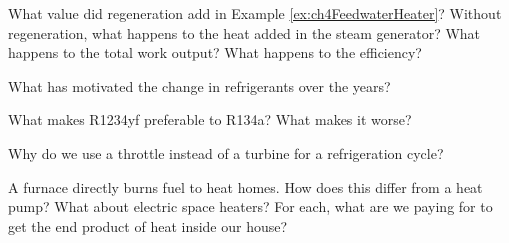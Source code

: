 \begin{homework}
  \question What value did regeneration add in Example \ref{ex:ch4FeedwaterHeater}? Without regeneration, what happens to the heat added in the steam generator?  What happens to the total work output? What happens to the efficiency?
  
  \question What has motivated the change in refrigerants over the years?
  
  \question What makes R1234yf preferable to R134a?  What makes it worse?
  
  \question Why do we use a throttle instead of a turbine for a refrigeration cycle?
  
  \question A furnace directly burns fuel to heat homes.  How does this differ from a heat pump?  What about electric space heaters?  For each, what are we paying for to get the end product of heat inside our house?
  

\end{homework}
